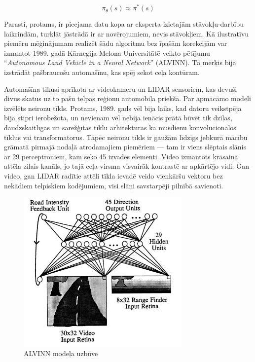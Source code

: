 \documentclass[12pt, a4paper]{article}
\numberwithin{equation}{section} %
\begin{document}
\begin{equation}
    \pi_{\theta}(s) \approx \pi^*(s)
\end{equation}

Parasti, protams, ir pieejama datu kopa ar eksperta izietajām stāvokļu-darbību laikrindām, turklāt jāstrādā ir ar novērojumiem, nevis stāvokļiem. Kā ilustratīvu piemēru mēģinājumam realizēt šādu algoritmu bez īpašām korekcijām var izmantot 1989. gadā Kārnegija-Melona Universitātē veikto pētījumu ``\textit{Autonomous Land Vehicle in a Neural Network}'' (ALVINN)\cite{pomerleau1989alvinn}. Tā mērķis bija izstrādāt pašbraucošu automašīnu, kas spēj sekot ceļa kontūram.

Automašīna tikusi aprīkota ar videokameru un LIDAR sensoriem, kas devuši divus skatus uz to pašu telpas reģionu automobiļa priekšā. Par apmācāmo modeli izvēlēts neironu tīkls. Protams, 1989. gads vēl bija laiks, kad datoru veikstpēja bija stipri ierobežota, un nevienam vēl nebija ienācis prātā būvēt tik dziļas, daudzskaitlīgas un sarežģītas tīklu arhitektūras kā mūsdienu konvolucionālos tīklus vai transformatorus. Tāpēc neironu tīkls ir gaužām līdzīgs jebkurā mācību grāmatā pirmajā nodaļā atrodamajiem piemēriem --- tam ir viens slēptais slānis ar 29 perceptroniem, kam seko 45 izvades elementi. Video izmantots krāsainā attēla zilais kanāls, jo tajā ceļa virsma visvairāk kontrastē ar apkārtējo vidi. Gan video, gan LIDAR radītie attēli tīkla ievadē veido vienkāršu vektoru bez nekādiem telpiskiem kodējumiem, visi slāņi savstarpēji pilnībā savienoti.

\newpage
\begin{figure}[h!]
    \centering
    \includegraphics[height=8cm,page=1]{../img/alvinn_architecture.png}
    \caption{ALVINN modeļa uzbūve\cite{pomerleau1989alvinn}}
\end{figure}
\end{document}
